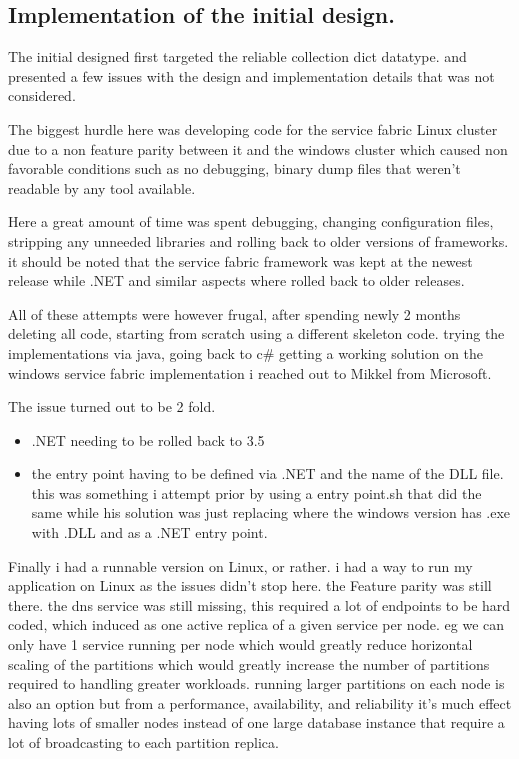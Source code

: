 \documentclass[a4paper,10pt,titlepage]{report}
\begin{document}
\subsection{Implementation of the initial design.}

The initial designed first targeted the reliable collection dict datatype. and presented a few issues with the design and implementation details that was not considered. 

The biggest hurdle here was developing code for the service fabric Linux cluster due to a non feature parity between it and the windows cluster which caused non favorable conditions such as no debugging, binary dump files that weren't readable by any tool available. 

Here a great amount of time was spent debugging, changing configuration files, stripping any unneeded libraries and rolling back to older versions of frameworks. it should be noted that the service fabric framework was kept at the newest release while .NET and similar aspects where rolled back to older releases.

All of these attempts were however frugal, after spending newly 2 months deleting all code, starting from scratch using a different skeleton code. trying the implementations via java, going back to c# getting a working solution on the windows service fabric implementation i reached out to Mikkel from Microsoft. 

The issue turned out to be 2 fold.
\begin{itemize}
\item .NET needing to be rolled back to 3.5
\item the entry point having to be defined via .NET and the name of the DLL file. this was something i attempt prior by using a entry point.sh that did the same while his solution was just replacing where the windows version has .exe with .DLL and as a .NET entry point.
\end{itemize}

Finally i had a runnable version on Linux, or rather. i had a way to run my application on Linux as the issues didn't stop here. the Feature parity was still there. the dns service was still missing, this required a lot of endpoints to be hard coded, which induced as one active replica of a given service per node. eg we can only have 1 service running per node which would greatly reduce horizontal scaling of the partitions which would greatly increase the number of partitions required to handling greater workloads. running larger partitions on each node is also an option but from a performance, availability, and reliability it's much effect having lots of smaller nodes instead of one large database instance that require a lot of broadcasting to each partition replica.
\end{document}
